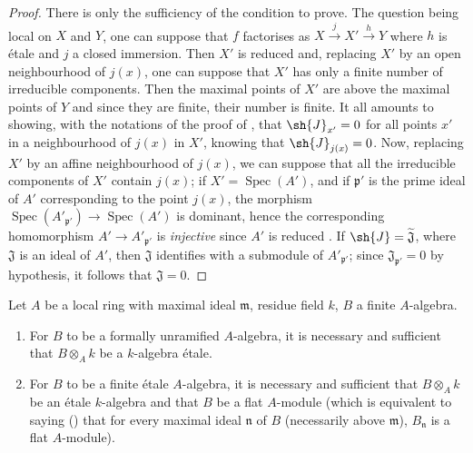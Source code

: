 \begin{proof}
There is only the sufficiency of the condition to prove.
The question being local on $X$ and $Y$, one can suppose  that $f$ factorises as $X\xrightarrow{j}X'\xrightarrow{h}Y$ where $h$ is \'etale and $j$ a closed immersion.
Then $X'$ is reduced  and, replacing $X'$ by an open neighbourhood of $j(x)$, one can suppose that $X'$ has only a finite number of irreducible components.
Then the maximal points of $X'$ are above the maximal points of $Y$  and since they are finite, their number is finite.
It all amounts to showing, with the notations of the proof of , that $\sh{J}_{x'}=0$ for all points $x'$ in a neighbourhood of $j(x)$ in $X'$, knowing that $\sh{J}_{j(x)}=0$.
Now, replacing $X'$ by an affine neighbourhood of $j(x)$, we can suppose that all the irreducible components of $X'$ contain $j(x)$;
if $X'=\operatorname{Spec}(A')$, and if $\mathfrak{p}'$ is the prime ideal of $A'$ corresponding to the point $j(x)$, the morphism $\operatorname{Spec}(A'_{\mathfrak{p}'})\to\operatorname{Spec}(A')$ is dominant, hence the corresponding homomorphism $A'\to A'_{\mathfrak{p}'}$ is \emph{injective} since $A'$ is reduced .
If $\sh{J}=\widetilde{\mathfrak{J}}$, where $\mathfrak{J}$ is an ideal of $A'$, then $\mathfrak{J}$ identifies with a submodule of $A'_{\mathfrak{p}'}$; since $\mathfrak{J}_{\mathfrak{p}'}=0$ by hypothesis, it follows that $\mathfrak{J}=0$.
\end{proof}

\begin{corollary}[18.4.14]
\label{IV.18.4.14}
Let $A$ be a local ring with maximal ideal $\mathfrak{m}$, residue field $k$, $B$ a finite $A$-algebra.
\begin{enumerate}
  \item[(i)] For $B$ to be a formally unramified $A$-algebra, it is necessary and sufficient that $B\otimes_A k$ be a $k$-algebra \'etale.
  \item[(ii)] For $B$ to be a finite \'etale $A$-algebra, it is necessary and sufficient that $B\otimes_A k$ be an \'etale $k$-algebra and that $B$ be a flat $A$-module (which is equivalent to saying () that for every maximal ideal $\mathfrak{n}$ of $B$ (necessarily above $\mathfrak{m}$), $B_\mathfrak{n}$ is a flat $A$-module).
\end{enumerate}
\end{corollary}


